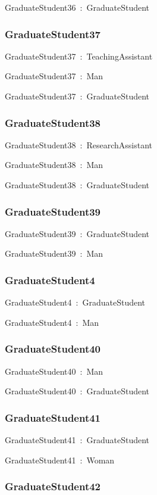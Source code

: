 \documentclass{article}
\begin{document}
GraduateStudent36~:~GraduateStudent

\subsubsection*{GraduateStudent37}

GraduateStudent37~:~TeachingAssistant

GraduateStudent37~:~Man

GraduateStudent37~:~GraduateStudent

\subsubsection*{GraduateStudent38}

GraduateStudent38~:~ResearchAssistant

GraduateStudent38~:~Man

GraduateStudent38~:~GraduateStudent

\subsubsection*{GraduateStudent39}

GraduateStudent39~:~GraduateStudent

GraduateStudent39~:~Man

\subsubsection*{GraduateStudent4}

GraduateStudent4~:~GraduateStudent

GraduateStudent4~:~Man

\subsubsection*{GraduateStudent40}

GraduateStudent40~:~Man

GraduateStudent40~:~GraduateStudent

\subsubsection*{GraduateStudent41}

GraduateStudent41~:~GraduateStudent

GraduateStudent41~:~Woman

\subsubsection*{GraduateStudent42}
\end{document}
